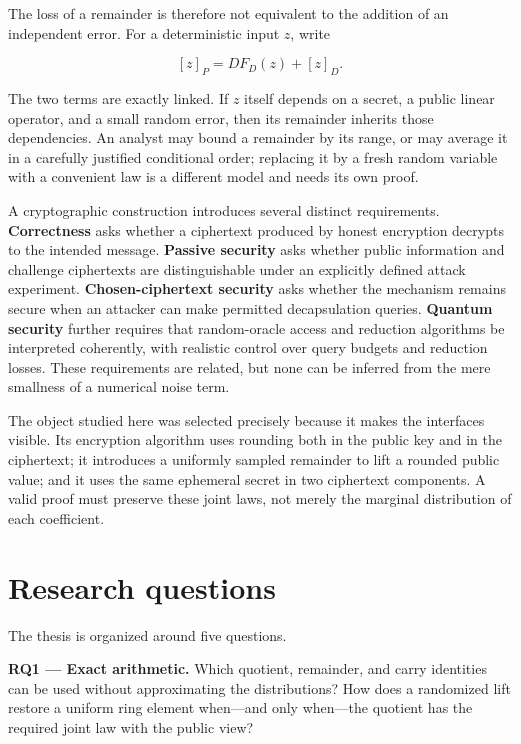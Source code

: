 \documentclass[
  11pt,
  a4paper,
  oneside]{report}
\begin{document}
The loss of a remainder is therefore not equivalent to the addition of
an independent error. For a deterministic input \(z\), write

\[
[z]_P=D F_D(z)+[z]_D.
\]

The two terms are exactly linked. If \(z\) itself depends on a secret, a
public linear operator, and a small random error, then its remainder
inherits those dependencies. An analyst may bound a remainder by its
range, or may average it in a carefully justified conditional order;
replacing it by a fresh random variable with a convenient law is a
different model and needs its own proof.

A cryptographic construction introduces several distinct requirements.
\textbf{Correctness} asks whether a ciphertext produced by honest
encryption decrypts to the intended message. \textbf{Passive security}
asks whether public information and challenge ciphertexts are
distinguishable under an explicitly defined attack experiment.
\textbf{Chosen-ciphertext security} asks whether the mechanism remains
secure when an attacker can make permitted decapsulation queries.
\textbf{Quantum security} further requires that random-oracle access and
reduction algorithms be interpreted coherently, with realistic control
over query budgets and reduction losses. These requirements are related,
but none can be inferred from the mere smallness of a numerical noise
term.

The object studied here was selected precisely because it makes the
interfaces visible. Its encryption algorithm uses rounding both in the
public key and in the ciphertext; it introduces a uniformly sampled
remainder to lift a rounded public value; and it uses the same ephemeral
secret in two ciphertext components. A valid proof must preserve these
joint laws, not merely the marginal distribution of each coefficient.

\section{Research questions}\label{research-questions}

The thesis is organized around five questions.

\textbf{RQ1 --- Exact arithmetic.} Which quotient, remainder, and carry
identities can be used without approximating the distributions? How does
a randomized lift restore a uniform ring element when---and only
when---the quotient has the required joint law with the public view?
\end{document}
